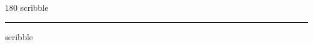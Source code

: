 
\begin{frame}
\begin{center}
\begin{turn}{180}
{\fontsize{2.5cm}{1em}\selectfont scribble}
\end{turn}
\vspace{1em}\par  
\hrule
\vspace{1em}\par  
{\fontsize{2.5cm}{1em}\selectfont scribble}
\end{center}
\end{frame}
